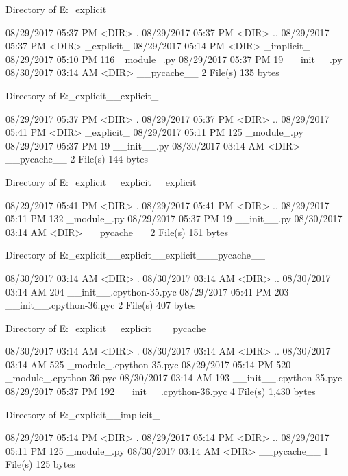 Directory of E:\Python\apeman\mockup\explicitImport\_explicit_

08/29/2017  05:37 PM    <DIR>          .
08/29/2017  05:37 PM    <DIR>          ..
08/29/2017  05:37 PM    <DIR>          _explicit_
08/29/2017  05:14 PM    <DIR>          _implicit_
08/29/2017  05:10 PM               116 _module_.py
08/29/2017  05:37 PM                19 __init__.py
08/30/2017  03:14 AM    <DIR>          __pycache__
               2 File(s)            135 bytes

 Directory of E:\Python\apeman\mockup\explicitImport\_explicit_\_explicit_

08/29/2017  05:37 PM    <DIR>          .
08/29/2017  05:37 PM    <DIR>          ..
08/29/2017  05:41 PM    <DIR>          _explicit_
08/29/2017  05:11 PM               125 _module_.py
08/29/2017  05:37 PM                19 __init__.py
08/30/2017  03:14 AM    <DIR>          __pycache__
               2 File(s)            144 bytes

 Directory of E:\Python\apeman\mockup\explicitImport\_explicit_\_explicit_\_explicit_

08/29/2017  05:41 PM    <DIR>          .
08/29/2017  05:41 PM    <DIR>          ..
08/29/2017  05:11 PM               132 _module_.py
08/29/2017  05:37 PM                19 __init__.py
08/30/2017  03:14 AM    <DIR>          __pycache__
               2 File(s)            151 bytes

 Directory of E:\Python\apeman\mockup\explicitImport\_explicit_\_explicit_\_explicit_\__pycache__

08/30/2017  03:14 AM    <DIR>          .
08/30/2017  03:14 AM    <DIR>          ..
08/30/2017  03:14 AM               204 __init__.cpython-35.pyc
08/29/2017  05:41 PM               203 __init__.cpython-36.pyc
               2 File(s)            407 bytes

 Directory of E:\Python\apeman\mockup\explicitImport\_explicit_\_explicit_\__pycache__

08/30/2017  03:14 AM    <DIR>          .
08/30/2017  03:14 AM    <DIR>          ..
08/30/2017  03:14 AM               525 _module_.cpython-35.pyc
08/29/2017  05:14 PM               520 _module_.cpython-36.pyc
08/30/2017  03:14 AM               193 __init__.cpython-35.pyc
08/29/2017  05:37 PM               192 __init__.cpython-36.pyc
               4 File(s)          1,430 bytes

 Directory of E:\Python\apeman\mockup\explicitImport\_explicit_\_implicit_

08/29/2017  05:14 PM    <DIR>          .
08/29/2017  05:14 PM    <DIR>          ..
08/29/2017  05:11 PM               125 _module_.py
08/30/2017  03:14 AM    <DIR>          __pycache__
               1 File(s)            125 bytes

